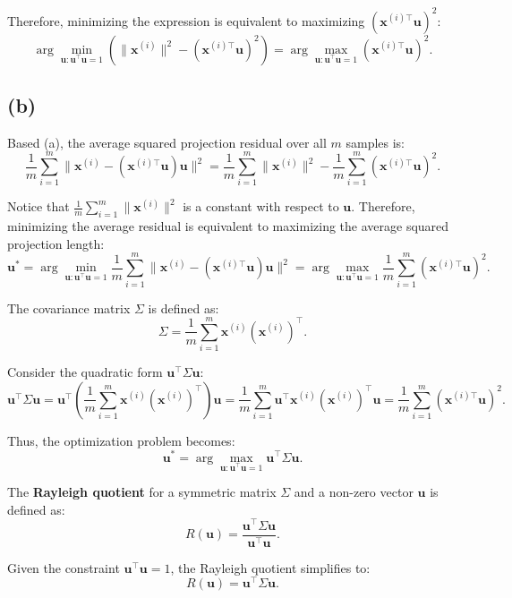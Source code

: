 \documentclass[12pt]{article}
\begin{document}
Therefore, minimizing the expression is equivalent to maximizing \( (\mathbf{x}^{(i)\top} \mathbf{u})^2 \):
\[
\arg\min_{\mathbf{u}: \mathbf{u}^\top \mathbf{u} = 1} \left( \|\mathbf{x}^{(i)}\|^2 - (\mathbf{x}^{(i)\top} \mathbf{u})^2 \right) = \arg\max_{\mathbf{u}: \mathbf{u}^\top \mathbf{u} = 1} (\mathbf{x}^{(i)\top} \mathbf{u})^2.
\]

\subsection*{(b)}

Based (a), the average squared projection residual over all \( m \) samples is:
\[
\frac{1}{m} \sum_{i=1}^m \|\mathbf{x}^{(i)} - (\mathbf{x}^{(i)\top} \mathbf{u})\mathbf{u}\|^2 = \frac{1}{m} \sum_{i=1}^m \|\mathbf{x}^{(i)}\|^2 - \frac{1}{m} \sum_{i=1}^m (\mathbf{x}^{(i)\top} \mathbf{u})^2.
\]

Notice that \( \frac{1}{m} \sum_{i=1}^m \|\mathbf{x}^{(i)}\|^2 \) is a constant with respect to \( \mathbf{u} \). Therefore, minimizing the average residual is equivalent to maximizing the average squared projection length:
\[
\mathbf{u}^* = \arg \min_{\mathbf{u}: \mathbf{u}^\top \mathbf{u} = 1} \frac{1}{m} \sum_{i=1}^m \|\mathbf{x}^{(i)} - (\mathbf{x}^{(i)\top} \mathbf{u})\mathbf{u}\|^2 = \arg \max_{\mathbf{u}: \mathbf{u}^\top \mathbf{u} = 1} \frac{1}{m} \sum_{i=1}^m (\mathbf{x}^{(i)\top} \mathbf{u})^2.
\]

The covariance matrix \( \Sigma \) is defined as:
\[
\Sigma = \frac{1}{m} \sum_{i=1}^m \mathbf{x}^{(i)} (\mathbf{x}^{(i)})^\top.
\]

Consider the quadratic form \( \mathbf{u}^\top \Sigma \mathbf{u} \):
\[
\mathbf{u}^\top \Sigma \mathbf{u} = \mathbf{u}^\top \left( \frac{1}{m} \sum_{i=1}^m \mathbf{x}^{(i)} (\mathbf{x}^{(i)})^\top \right) \mathbf{u} = \frac{1}{m} \sum_{i=1}^m \mathbf{u}^\top \mathbf{x}^{(i)} (\mathbf{x}^{(i)})^\top \mathbf{u} = \frac{1}{m} \sum_{i=1}^m (\mathbf{x}^{(i)\top} \mathbf{u})^2.
\]

Thus, the optimization problem becomes:
\[
\mathbf{u}^* = \arg \max_{\mathbf{u}: \mathbf{u}^\top \mathbf{u} = 1} \mathbf{u}^\top \Sigma \mathbf{u}.
\]

The \textbf{Rayleigh quotient} for a symmetric matrix \( \Sigma \) and a non-zero vector \( \mathbf{u} \) is defined as:
\[
R(\mathbf{u}) = \frac{\mathbf{u}^\top \Sigma \mathbf{u}}{\mathbf{u}^\top \mathbf{u}}.
\]

Given the constraint \( \mathbf{u}^\top \mathbf{u} = 1 \), the Rayleigh quotient simplifies to:
\[
R(\mathbf{u}) = \mathbf{u}^\top \Sigma \mathbf{u}.
\]
\end{document}
